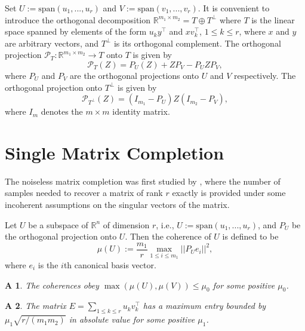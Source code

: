 \documentclass{article} %
\newtheorem{assumption}{A}
\newcommand\mc{\mathcal} %
\begin{document}
Set $U := \text{span}(u_1,...,u_r)$ and $V := \text{span}(v_1,...,v_r)$. It is convenient to introduce the orthogonal decomposition $\mathbb{R}^{m_1 \times m_2} = T \oplus T^\perp$ where $T$ is the linear space spanned by elements of the form $u_ky^\top$ and $xv_k^\top$, $1\leq k \leq r$, where $x$ and $y$ are arbitrary vectors, and $T^\perp$ is its orthogonal complement. The orthogonal projection $\mc{P}_T:\mathbb{R}^{m_1 \times m_2} \rightarrow T$ onto $T$ is given by
\begin{equation}
\mc{P}_T(Z) = P_U(Z) + ZP_V - P_UZP_V,
\end{equation}
where $P_U$ and $P_V$ are the orthogonal projections onto $U$ and $V$ respectively. The orthogonal projection onto $T^\perp$ is given by
\begin{equation}
\mc{P}_{T^\perp}(Z) = (I_{m_1} - P_U)Z(I_{m_2} - P_V),
\end{equation}
where $I_m$ denotes the $m \times m$ identity matrix.

\section{Single Matrix Completion}
The noiseless matrix completion was first studied by \cite{candes2009exact}, where the number of samples needed to recover a matrix of rank $r$ exactly is provided under some incoherent assumptions on the singular vectors of the matrix.
\begin{definition}
Let $U$ be a subspace of $\mathbb{R}^n$ of dimension $r$, i.e., $U := \text{span}(u_1, ..., u_r)$, and $P_U$ be the orthogonal projection onto $U$. Then the coherence of $U$ is defined to be
\begin{equation}
\mu(U) := \frac{m_1}{r}\max_{1\leq i \leq m_1}||P_U e_i||^2,
\end{equation}
where $e_i$ is the $i$th canonical basis vector.
\end{definition}

\begin{assumption}
The coherences obey $\max(\mu(U),\mu(V)) \leq \mu_0$ for some positive $\mu_0$.
\end{assumption}
\begin{assumption}
The matrix $E=\sum_{1\leq k \leq r} u_k v_k^\top$ has a maximum entry bounded by $\mu_1 \sqrt{r/(m_1m_2)}$ in absolute value for some positive $\mu_1$.
\end{assumption}
\end{document}
